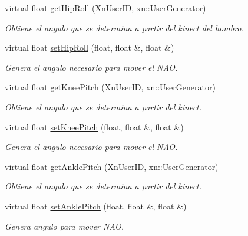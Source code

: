 \begin{DoxyCompactItemize}
\item 
virtual float \hyperlink{class_r_leg_a983e8da29c577737694dc72a9573fc5c}{get\-Hip\-Roll} (Xn\-User\-I\-D, xn\-::\-User\-Generator)
\begin{DoxyCompactList}\small\item\em Obtiene el angulo que se determina a partir del kinect del hombro. \end{DoxyCompactList}\item 
\hypertarget{class_r_leg_a44386f31cf1afb03ab3f433a0189d820}{virtual float \hyperlink{class_r_leg_a44386f31cf1afb03ab3f433a0189d820}{set\-Hip\-Roll} (float, float \&, float \&)}\label{class_r_leg_a44386f31cf1afb03ab3f433a0189d820}

\begin{DoxyCompactList}\small\item\em Genera el angulo necesario para mover el N\-A\-O. \end{DoxyCompactList}\item 
\hypertarget{class_r_leg_a1e66a29fe07ec16275f86bffe7482fee}{virtual float \hyperlink{class_r_leg_a1e66a29fe07ec16275f86bffe7482fee}{get\-Knee\-Pitch} (Xn\-User\-I\-D, xn\-::\-User\-Generator)}\label{class_r_leg_a1e66a29fe07ec16275f86bffe7482fee}

\begin{DoxyCompactList}\small\item\em Obtiene el angulo que se determina a partir del kinect. \end{DoxyCompactList}\item 
\hypertarget{class_r_leg_a65c0d913ed2c07515cd178b190b4287c}{virtual float \hyperlink{class_r_leg_a65c0d913ed2c07515cd178b190b4287c}{set\-Knee\-Pitch} (float, float \&, float \&)}\label{class_r_leg_a65c0d913ed2c07515cd178b190b4287c}

\begin{DoxyCompactList}\small\item\em Genera el angulo necesario para mover el N\-A\-O. \end{DoxyCompactList}\item 
\hypertarget{class_r_leg_aa8a63cd3f3d06ace1566a531b5213860}{virtual float \hyperlink{class_r_leg_aa8a63cd3f3d06ace1566a531b5213860}{get\-Ankle\-Pitch} (Xn\-User\-I\-D, xn\-::\-User\-Generator)}\label{class_r_leg_aa8a63cd3f3d06ace1566a531b5213860}

\begin{DoxyCompactList}\small\item\em Obtiene el angulo que se determina a partir del kinect. \end{DoxyCompactList}\item 
\hypertarget{class_r_leg_a6ac413efc8dc05dce14096d9797f9149}{virtual float \hyperlink{class_r_leg_a6ac413efc8dc05dce14096d9797f9149}{set\-Ankle\-Pitch} (float, float \&, float \&)}\label{class_r_leg_a6ac413efc8dc05dce14096d9797f9149}

\begin{DoxyCompactList}\small\item\em Genera angulo para mover N\-A\-O. \end{DoxyCompactList}\end{DoxyCompactItemize}


